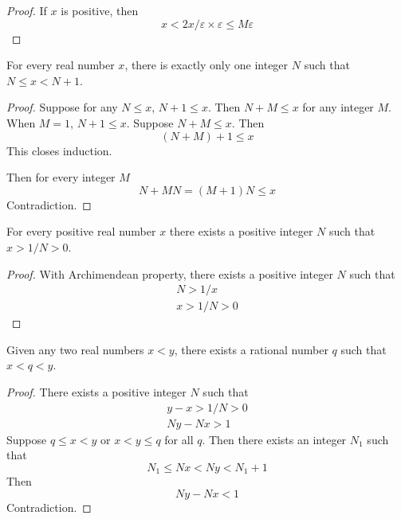 \documentclass{blog}
\begin{document}
\begin{proof}
  If $x$ is positive, then
  \begin{equation*}
    x < 2 x / \varepsilon \times \varepsilon \leq M \varepsilon
  \end{equation*}
\end{proof}

\begin{proposition}
  For every real number $x$, there is exactly only one integer $N$ such that
  $N \leq x < N + 1$.
\end{proposition}

\begin{proof}
  Suppose for any $N \leq x$, $N + 1 \leq x$.
  Then $N + M \leq x$ for any integer $M$.
  When $M = 1$, $N + 1 \leq x$.
  Suppose $N + M \leq x$.
  Then
  \begin{equation*}
    (N + M) + 1 \leq x
  \end{equation*}
  This closes induction.

  Then for every integer $M$
  \begin{equation*}
    N + M N = (M + 1) N \leq x
  \end{equation*}
  Contradiction.
\end{proof}

\begin{proposition}
  \label{PROP:X_1_N_0}
  For every positive real number $x$ there exists a positive integer $N$ such that
  $x > 1 / N > 0$.
\end{proposition}

\begin{proof}
  With Archimendean property,
  there exists a positive integer $N$ such that
  \begin{gather*}
    N > 1 / x \\
    x > 1 / N > 0
  \end{gather*}
\end{proof}

\begin{proposition}
  Given any two real numbers $x < y$, there exists a rational number $q$
  such that $x < q < y$.
\end{proposition}

\begin{proof}
  There exists a positive integer $N$ such that
  \begin{gather*}
    y - x > 1 / N > 0 \\
    N y - N x > 1
  \end{gather*}
  Suppose $q \leq x < y$ or $x < y \leq q$ for all $q$.
  Then there exists an integer $N_{1}$ such that
  \begin{equation*}
    N_{1} \leq N x < N y < N_{1} + 1
  \end{equation*}
  Then
  \begin{equation*}
    N y - N x < 1
  \end{equation*}
  Contradiction.
\end{proof}
\end{document}
